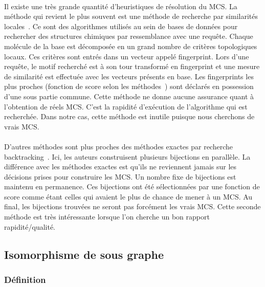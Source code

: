\documentclass[12pt,french,twoside]{report}
\begin{document}
\paragraph{}Il existe une très grande quantité d'heuristiques de résolution du MCS.
La méthode qui revient le plus souvent est une méthode de recherche par similarités locales~\cite{yan_substructure_2005,willett_similarity_2011}.
Ce sont des algorithmes utilisés au sein de bases de données pour rechercher des structures chimiques par ressemblance avec une requête.
Chaque molécule de la base est décomposée en un grand nombre de critères topologiques locaux.
Ces critères sont entrés dans un vecteur appelé fingerprint.
Lors d'une requête, le motif recherché est à son tour transformé en fingerprint et une mesure de similarité est effectuée avec les vecteurs présents en base.
Les fingerprints les plus proches (fonction de score selon les méthodes~\cite{maggiora_molecular_2011,ndiaye_cp_2011}) sont déclarés en possession d'une sous partie commune.
Cette méthode ne donne aucune assurance quant à l'obtention de réels MCS.
C'est la rapidité d'exécution de l'algorithme qui est recherchée.
Dans notre cas, cette méthode est inutile puisque nous cherchons de vrais MCS.

\paragraph{}D'autres méthodes sont plus proches des méthodes exactes par recherche backtracking~\cite{grosso_simple_2008, wang_fmcsr:_2013}.
Ici, les auteurs construisent plusieurs bijections en parallèle.
La différence avec les méthodes exactes est qu'ils ne reviennent jamais sur les décisions prises pour construire les MCS.
Un nombre fixe de bijections est maintenu en permanence.
Ces bijections ont été sélectionnées par une fonction de score comme étant celles qui avaient le plus de chance de mener à un MCS.
Au final, les bijections trouvées ne seront pas forcément les vrais MCS.
Cette seconde méthode est très intéressante lorsque l'on cherche un bon rapport rapidité/qualité.


\subsection{Isomorphisme de sous graphe}

\subsubsection{Définition}
\end{document}
